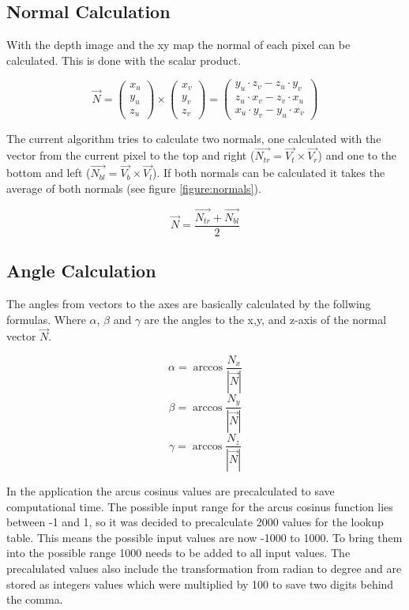 \subsection{Normal Calculation}
With the depth image and the xy map the normal of each pixel can be calculated. This is done with the scalar product.


$$ \vec{N} = \left( \begin{array}{c} x_u \\ y_u \\ z_u \end{array} \right) \times \left( \begin{array}{c} x_v \\ y_v \\ z_v \end{array} \right) 
= \left( \begin{array}{c} y_u \cdot z_v - z_u \cdot y_v \\ z_u \cdot x_v - z_v \cdot x_u \\ x_u \cdot y_v - y_u \cdot x_v \end{array}\right)
$$

The current algorithm tries to calculate two normals, one calculated with the vector from the current pixel to the top and right 
($\vec{N_{tr}}=\vec{V_t}\times\vec{V_r}$) and one to
the bottom and left ($\vec{N_{bl}}=\vec{V_b}\times\vec{V_l}$). 
If both normals can be calculated it takes the average of both normals (see figure \vref{figure:normals}).

$$ \vec{N} = \frac{\vec{N_{tr}} + \vec{N_{bl}}}{2}$$


\subsection{Angle Calculation}

The angles from vectors to the axes are basically calculated by the follwing formulas. Where $\alpha$, $\beta$ and $\gamma$ 
are the angles to the x,y, and z-axis of the normal vector $\vec{N}$.

$$ \alpha = \arccos \frac{N_x}{\left|\vec{N}\right|}  $$
$$ \beta  = \arccos \frac{N_y}{\left|\vec{N}\right|}  $$
$$ \gamma = \arccos \frac{N_z}{\left|\vec{N}\right|}  $$

In the application the arcus cosinus values are precalculated to save computational time.
The possible input range for the arcus cosinus function lies between -1 and 1, so it was decided
to precalculate 2000 values for the lookup table. This means the possible input values are now
-1000 to 1000. To bring them into the possible range 1000 needs to be added to all input values.
The precalulated values also include the transformation from radian to degree and are stored as 
integers values which were multiplied by 100 to save two digits behind the comma.

